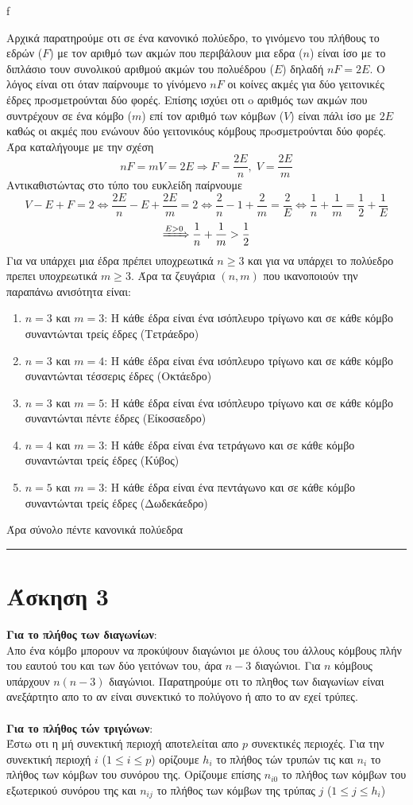 f\documentclass[12pt]{article}
\begin{document}
Aρχικά παρατηρούμε οτι σε ένα κανονικό πολύεδρο, το γινόμενο του πλήθους το εδρών ($F$) με τον αριθμό των ακμών που περιβάλουν μια εδρα ($n$) είναι ίσο με το 
διπλάσιο τουν συνολικού αριθμού ακμών του πολυέδρου ($E$) δηλαδή $nF=2E$. O λόγος είναι οτι όταν παίρνουμε το γίνόμενο $nF$ οι κοίνες ακμές για δύο γειτονικές έδρες πρoσμετρούνται δύο φορές.
Επίσης ισχύει οτι o αριθμός των ακμών που συντρέχουν σε ένα κόμβο ($m$) επί τον αριθμό των κόμβων ($V$) είναι πάλι ίσο με $2E$ καθώς οι ακμές που ενώνουν δύο γειτονικόυς κόμβους  πρoσμετρούνται δύο φορές.
Άρα καταλήγουμε με την σχέση 
$$nF = mV =2E  \Rightarrow F = \frac{2E}{n},\; V = \frac{2E}{m}$$
Αντικαθιστώντας στο τύπο του ευκλείδη παίρνουμε
$$
    V-E+F=2 \Leftrightarrow \frac{2E}{n} -E + \frac{2E}{m} =2 \Leftrightarrow \frac{2}{n} -1 + \frac{2}{m} =\frac{2}{E} \Leftrightarrow \frac{1}{n} + \frac{1}{m} =\frac{1}{2}+\frac{1}{E}
$$
$$\xRightarrow{E>0}\frac{1}{n} + \frac{1}{m} >\frac{1}{2}$$
Για να υπάρχει μια έδρα πρέπει υποχρεωτικά $n\geq 3$ και για να υπάρχει το πολύεδρο πρεπει υποχρεωτικά $m\geq 3$. Άρα τα ζευγάρια $(n,m)$ που ικανοποιούν την παραπάνω ανισότητα είναι:
\begin{enumerate}
    \item $n=3$ και $m=3$: Η κάθε έδρα είναι ένα ισόπλευρο τρίγωνο και σε κάθε κόμβο συναντώνται τρείς έδρες (Τετράεδρο)
    \item $n=3$ και $m=4$: Η κάθε έδρα είναι ένα ισόπλευρο τρίγωνο και σε κάθε κόμβο συναντώνται τέσσερις έδρες (Οκτάεδρο)
    \item $n=3$ και $m=5$: Η κάθε έδρα είναι ένα ισόπλευρο τρίγωνο και σε κάθε κόμβο συναντώνται πέντε έδρες (Είκοσαεδρο)
    \item $n=4$ και $m=3$: Η κάθε έδρα είναι ένα τετράγωνο και σε κάθε κόμβο συναντώνται τρείς έδρες (Κύβος)
    \item $n=5$ και $m=3$: Η κάθε έδρα είναι ένα πεντάγωνο και σε κάθε κόμβο συναντώνται τρείς έδρες (Δωδεκάεδρο)
\end{enumerate}

Άρα σύνολο πέντε κανονικά πολύεδρα\\
\rule{\textwidth}{.5pt}
\section*{Άσκηση 3}
{\bf Για το πλήθος των διαγωνίων}:\\
Απο ένα κόμβο μπορουν να προκύψουν διαγώνιοι με όλους του άλλους κόμβους πλήν του εαυτού του και των δύο γειτόνων του, άρα $n-3$ διαγώνιοι. Για $n$ κόμβους υπάρχουν $n(n-3)$ διαγώνιοι. Παρατηρούμε οτι το πληθος των διαγωνίων είναι ανεξάρτητο απο το αν είναι συνεκτικό το πολύγονο ή απο το αν εχεί τρύπες.\\ \\
{\bf Για το πλήθος τών τριγώνων}:\\
Έστω οτι η μή συνεκτική περιοχή αποτελείται απο $p$ συνεκτικές περιοχές. Για την συνεκτική περιοχή $i$ ($1\leq i\leq p$) ορίζουμε $h_i$ το πλήθος τών τρυπών τις και $n_i$ το πλήθος των κόμβων του συνόρου της. Ορίζουμε επίσης  $n_{i0}$ το πλήθος των κόμβων του εξωτερικού συνόρου της και  $n_{ij}$ το πλήθος των κόμβων της τρύπας $j$ ($1\leq j\leq h_i$)
\end{document}
